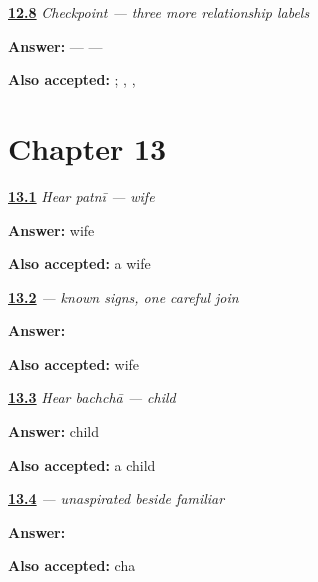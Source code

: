 \noindent\begin{minipage}[t]{\linewidth}
\raggedright
\hyperlink{review-MW-R09-maternal-three-payoff}{\textbf{12.8}} \emph{Checkpoint — three more relationship labels}\par
\small \textbf{Answer:}  —  — \par
\footnotesize \textbf{Also accepted:}   ; , , 
\end{minipage}\par\medskip

\section*{Chapter 13}

\noindent\begin{minipage}[t]{\linewidth}
\raggedright
\hyperlink{review-MW-C09-hear-patni-meaning}{\textbf{13.1}} \emph{Hear \emph{patnī} — wife}\par
\small \textbf{Answer:} wife\par
\footnotesize \textbf{Also accepted:} a wife
\end{minipage}\par\medskip

\noindent\begin{minipage}[t]{\linewidth}
\raggedright
\hyperlink{review-MW-C09-patni-dictation}{\textbf{13.2}} \emph{ — known signs, one careful join}\par
\small \textbf{Answer:} \par
\footnotesize \textbf{Also accepted:}  wife
\end{minipage}\par\medskip

\noindent\begin{minipage}[t]{\linewidth}
\raggedright
\hyperlink{review-MW-C09-hear-bachcha-meaning}{\textbf{13.3}} \emph{Hear \emph{bachchā} — child}\par
\small \textbf{Answer:} child\par
\footnotesize \textbf{Also accepted:} a child
\end{minipage}\par\medskip

\noindent\begin{minipage}[t]{\linewidth}
\raggedright
\hyperlink{review-MW-W09-cha-write}{\textbf{13.4}} \emph{ — unaspirated beside familiar }\par
\small \textbf{Answer:} \par
\footnotesize \textbf{Also accepted:}  cha
\end{minipage}\par\medskip

